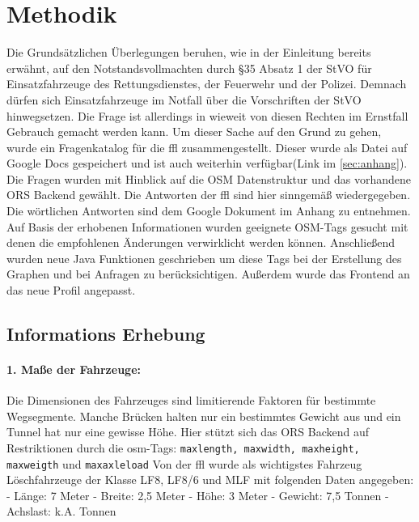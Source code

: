 \section{Methodik}
Die Grundsätzlichen Überlegungen beruhen, wie in der Einleitung bereits erwähnt, auf den Notstandsvollmachten durch §35 Absatz 1 der StVO für Einsatzfahrzeuge des Rettungsdienstes, der Feuerwehr und der Polizei.
Demnach dürfen sich Einsatzfahrzeuge im Notfall über die Vorschriften der StVO hinwegsetzen.
Die Frage ist allerdings in wieweit von diesen Rechten im Ernstfall Gebrauch gemacht werden kann.
Um dieser Sache auf den Grund zu gehen, wurde ein Fragenkatalog für die \gls{ffl} zusammengestellt.
Dieser wurde als Datei auf Google Docs gespeichert und ist auch weiterhin verfügbar(Link im \ref{sec:anhang}).
Die Fragen wurden mit Hinblick auf die OSM Datenstruktur und das vorhandene ORS Backend gewählt.
Die Antworten der \gls{ffl} sind hier sinngemäß wiedergegeben.
Die wörtlichen Antworten sind dem Google Dokument im Anhang zu entnehmen.
Auf Basis der erhobenen Informationen wurden geeignete OSM-Tags gesucht mit denen die empfohlenen Änderungen verwirklicht werden können.
Anschließend wurden neue Java Funktionen geschrieben um diese Tags bei der Erstellung des Graphen und bei Anfragen zu berücksichtigen.
Außerdem wurde das Frontend an das neue Profil angepasst.

\subsection{Informations Erhebung}

\paragraph*{1. Maße der Fahrzeuge:}
\label{frage1}
Die Dimensionen des Fahrzeuges sind limitierende Faktoren für bestimmte Wegsegmente.
Manche Brücken halten nur ein bestimmtes Gewicht aus und ein Tunnel hat nur eine gewisse Höhe.
Hier stützt sich das ORS Backend auf Restriktionen durch die \gls{osm}-Tags: \texttt{maxlength, maxwidth, maxheight, maxweigth} und \texttt{maxaxleload} Von der \gls{ffl} wurde als wichtigstes Fahrzeug Löschfahrzeuge der Klasse LF8, LF8/6 und MLF mit folgenden Daten angegeben:
- Länge: 7 Meter
- Breite: 2,5 Meter
- Höhe: 3 Meter
- Gewicht: 7,5 Tonnen
- Achslast: k.A. Tonnen 

